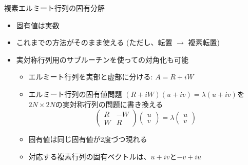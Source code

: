 \begin{frame}[t,fragile]{複素エルミート行列の固有分解}
  \begin{itemize}
  \item 固有値は実数
  \item これまでの方法がそのまま使える (ただし、転置 $\rightarrow$ 複素転置)
  \item 実対称行列用のサブルーチンを使っての対角化も可能
    \begin{itemize}
    \item エルミート行列を実部と虚部に分ける: $A = R + iW$
    \item エルミート行列の固有値問題 $(R + iW)(u+iv) = \lambda(u+iv)$を$2N \times 2N$の実対称行列の問題に書き換える
      \[
      \begin{pmatrix} R & -W \\ W & R \end{pmatrix}
      \begin{pmatrix} u \\ v \end{pmatrix}
      = 
      \lambda \begin{pmatrix} u \\ v \end{pmatrix}
      \]
    \item 固有値は同じ固有値が2度づつ現れる
    \item 対応する複素行列の固有ベクトルは、$u+iv$と$-v+iu$
    \end{itemize}
  \end{itemize}
\end{frame}
